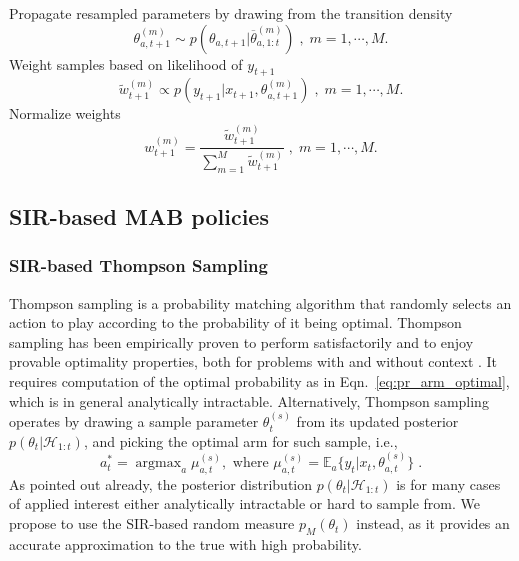 \documentclass{article}
\newcommand{\HH}{\mathcal{H}}
\newcommand{\ie}{i.e., }
\newcommand{\argmax}{\mathop{\mathrm{argmax}}}
\begin{document}
\begin{algorithm}
\begin{algorithmic}[1]
		\quad Propagate resampled parameters by drawing from the transition density
		\begin{equation}
		\theta_{a,t+1}^{(m)} \sim p(\theta_{a,t+1}|\overline{\theta}_{a,1:t}^{(m)}) \; , \; m=1,\cdots, M.
		\label{eq:sir-mab-propagate}
		\end{equation}
		\quad Weight samples based on likelihood of $y_{t+1}$
		\begin{equation}
		\widetilde{w}_{t+1}^{(m)} \propto p(y_{t+1}|x_{t+1},\theta_{a,t+1}^{(m)}) \; , \; m=1,\cdots, M.
		\label{eq:sir-mab-weights}
		\end{equation}
		\quad Normalize weights
		\begin{equation}
		w_{t+1}^{(m)}=\frac{\widetilde{w}_{t+1}^{(m)}}{\sum_{m=1}^M\widetilde{w}_{t+1}^{(m)}} \; , \; m=1,\cdots, M.
		\label{eq:sir-mab-weights-norm}
		\end{equation}
		\normalsize
		\ENDFOR
	\end{algorithmic}
\end{algorithm}

\subsection{SIR-based MAB policies}
\label{ssec:sir-policies}

\subsubsection{SIR-based Thompson Sampling}
\label{sssec:sir-ts}

Thompson sampling is a probability matching algorithm that randomly selects an action to play according to the probability of it being optimal. Thompson sampling has been empirically proven to perform satisfactorily and to enjoy provable optimality properties, both for problems with and without context \cite{j-Agrawal2012,j-Agrawal2012a,ic-Korda2013,j-Russo2014,j-Russo2016}. It requires computation of the optimal probability as in Eqn.~\eqref{eq:pr_arm_optimal}, which is in general analytically intractable. Alternatively, Thompson sampling operates by drawing a sample parameter $\theta_t^{(s)}$ from its updated posterior $p(\theta_t|\HH_{1:t})$, and picking the optimal arm for such sample, \ie
\begin{equation}
a_t^*=\argmax_a \mu_{a,t}^{(s)}, \text{ where } \mu_{a,t}^{(s)}=\mathbb{E}_{a}\{y_t|x_t,\theta_{a,t}^{(s)}\} \; .
\label{eq:mc_expected_reward}
\end{equation}
As pointed out already, the posterior distribution $p(\theta_t|\HH_{1:t})$ is for many cases of applied interest either analytically intractable or hard to sample from. We propose to use the SIR-based random measure $p_M(\theta_t)$ instead, as it provides an accurate approximation to the true with high probability.
\end{document}
